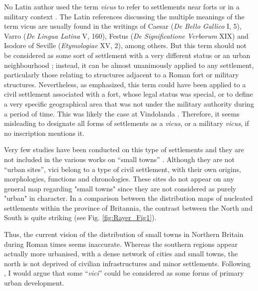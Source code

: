 No Latin author used the term \textit{vicus} to refer to settlements near forts or in a military context \parencites{Birley_2009}{Tarpin_2002}. The Latin references discussing the multiple meanings of the term vicus are usually found in the writings of Caesar (\textit{De Bello Gallico} I, 5), Varro (\textit{De Lingua Latina} V, 160), Festus (\textit{De Significatione Verborum} XIX) and Isodore of Seville (\textit{Etymologiae} XV, 2), among others. But this term should not be considered as some sort of settlement with a very different status or an urban neighbourhood \parencite[10]{Leveau_2002}; instead, it can be almost unanimously applied to any settlement, particularly those relating to structures adjacent to a Roman fort or military structures. Nevertheless, as \textcite[19]{Birley_2009} emphasized, this term could have been applied to a civil settlement associated with a fort, whose legal status was special, or to define a very specific geographical area that was not under the military authority during a period of time. This was likely the case at Vindolanda \parencite[1700]{RIB_1965}. Therefore, it seems misleading to designate all forms of settlements as a \textit{vicus}, or a military \textit{vicus}, if no inscription mentions it.

Very few studies have been conducted on this type of settlements and they are not included in the various works on “small towns” \parencites[e.g.][]{Jones_1990}{Todd_1970}{Wacher_1995}. Although they are not “urban sites”, vici belong to a type of civil settlement, with their own origins, morphologies, functions and chronologies. These sites do not appear on any general map regarding "small towns" \parencite[e.g.][156]{Jones_1990} since they are not considered as purely "urban" in character. In a comparison between the distribution maps of nucleated settlements within the province of Britannia, the contrast between the North and South is quite striking (see Fig. \ref{fig:Rayer_Fig1}).

Thus, the current vision of the distribution of small towns in Northern Britain during Roman times seems inaccurate. Whereas the southern regions appear actually more urbanised, with a dense network of cities and small towns, the north is not deprived of civilian infrastructures and minor settlements. Following \textcite[8]{Branigan_1980}, I would argue that some “\textit{vici}” could be considered as some forms of primary urban development.


